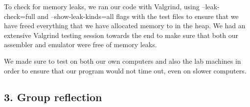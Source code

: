 \documentclass[a4paper]{article}
\begin{document}
To check for memory leaks, we ran our code with Valgrind, using --leak-check=full and --show-leak-kinds=all flags 
with the test files to ensure that we have freed everything that we have allocated memory to in the heap. We had an extensive Valgrind
testing session towards the end to make sure that both our assembler and emulator were free of memory leaks.

We made sure to test on both our own computers and also the lab machines in order to ensure that our program would not time out, even on
slower computers. 

\bigskip
\bigskip

\subsection*{3. Group reflection}
\end{document}
